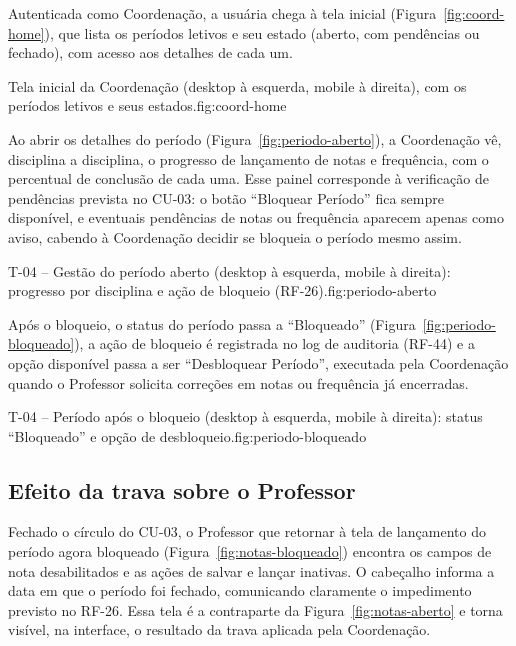 Autenticada como Coordenação, a usuária chega à tela inicial
(Figura~\ref{fig:coord-home}), que lista os períodos letivos e seu estado
(aberto, com pendências ou fechado), com acesso aos detalhes de cada um.

%
{Tela inicial da Coordenação (desktop à esquerda, mobile à direita), com os períodos letivos e seus estados.}{fig:coord-home}

Ao abrir os detalhes do período (Figura~\ref{fig:periodo-aberto}), a Coordenação
vê, disciplina a disciplina, o progresso de lançamento de notas e frequência,
com o percentual de conclusão de cada uma. Esse painel corresponde à verificação
de pendências prevista no CU-03: o botão ``Bloquear Período'' fica sempre
disponível, e eventuais pendências de notas ou frequência aparecem apenas como
aviso, cabendo à Coordenação decidir se bloqueia o período mesmo assim.

%
{T-04 -- Gestão do período aberto (desktop à esquerda, mobile à direita): progresso por disciplina e ação de bloqueio (RF-26).}{fig:periodo-aberto}

Após o bloqueio, o status do período passa a ``Bloqueado''
(Figura~\ref{fig:periodo-bloqueado}), a ação de bloqueio é registrada no log de
auditoria (RF-44) e a opção disponível passa a ser ``Desbloquear Período'',
executada pela Coordenação quando o Professor solicita correções em notas ou
frequência já encerradas.

%
{T-04 -- Período após o bloqueio (desktop à esquerda, mobile à direita): status ``Bloqueado'' e opção de desbloqueio.}{fig:periodo-bloqueado}

\subsection{Efeito da trava sobre o Professor}

Fechado o círculo do CU-03, o Professor que retornar à tela de lançamento do
período agora bloqueado (Figura~\ref{fig:notas-bloqueado}) encontra os campos de
nota desabilitados e as ações de salvar e lançar inativas. O cabeçalho informa a
data em que o período foi fechado, comunicando claramente o impedimento previsto
no RF-26. Essa tela é a contraparte da Figura~\ref{fig:notas-aberto} e torna
visível, na interface, o resultado da trava aplicada pela Coordenação.

